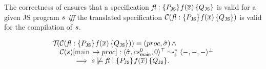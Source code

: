The correctness of \JSComp ensures that 
%
 a \javert  specification ${\mathit{fl}} : \{ P_{\mathtt{JS}} \} \, \mathit{f}(\overline{x}) \, \{ Q_{\mathtt{JS}} \}$
is valid for a given JS program $s$ \emph{iff} the translated specification 
$\mathcal{C}({\mathit{fl}} : \{ P_{\mathtt{JS}} \} \, \mathit{f}(\overline{x}) \, \{ Q_{\mathtt{JS}} \})$ is valid 
for the compilation of $s$.

\begin{corollary}\label{teo:bug:finding:sl:javert}
$$
\begin{array}{l}
\testify{}(\compile(\specsig{\pass_\jssubscript}{\pid(\jvec{x})}{\qass_\jssubscript}{\flag}))  = (\proc, \sstate) \, \wedge \\
\quad
  \compile(\jstmt)[\jsilmain \mapsto \proc] :  \transabssemrule{\sstate, \csmain, 0}{-, -, -}{\top}{\bot}{\symbolic} \\ \quad \qquad 
    \implies  
         \jstmt \not\satisfies \specsig{\pass_\jssubscript}{\pid(\jvec{x})}{\qass_\jssubscript}{\flag}.
\end{array}
$$
\end{corollary}






%
%
%



